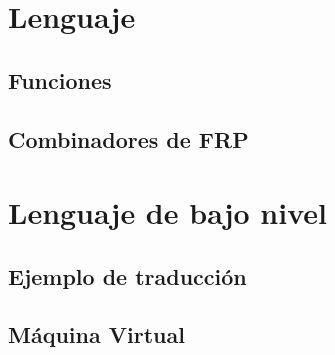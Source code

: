 


\section{Lenguaje \frob{}}


  \subsection{Funciones}
  
  \subsection{Combinadores de FRP}
  

\section{Lenguaje de bajo nivel}


\subsection{Ejemplo de traducción}


\subsection{Máquina Virtual}

